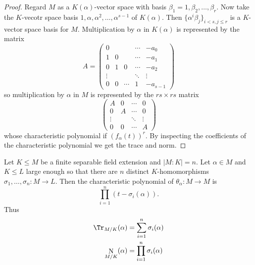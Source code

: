 \documentclass[a4paper]{article}
\DeclareMathOperator{\n}{N}
\begin{document}
\begin{proof}
  Regard \(M\) as a \(K(\alpha)\)-vector space with basis \(\beta_1 = 1, \beta_2, \dots, \beta_r\). Now take the \(K\)-vecotr space basis \(1, \alpha, \alpha^2, \dots, \alpha^{s - 1}\) of \(K(\alpha)\). Then \(\{\alpha^i \beta_j\}_{i < s, j \leq r}\) is a \(K\)-vector space basis for \(M\). Multiplication by \(\alpha\) in \(K(\alpha)\) is represented by the matrix
    \[
      A =
      \begin{pmatrix}
        0 & & & \cdots & -a_0 \\
        1 & 0 & & \cdots & -a_1 \\
        0 & 1 & 0 & \cdots & -a_2 \\
        \vdots & & & \ddots & \vdots \\
        0 & 0 & \cdots & 1 & -a_{s - 1}
      \end{pmatrix}
    \]
    so multiplication by \(\alpha\) in \(M\) is represented by the \(rs \times rs\) matrix
    \[
      \begin{pmatrix}
        A & 0 & \cdots & 0 \\
        0 & A & \cdots & 0 \\
        \vdots & & \ddots & \vdots \\
        0 & 0 & \cdots & A
      \end{pmatrix}
    \]
    whose characteristic polynomial if \((f_\alpha(t))^r\). By inspecting the coefficients of the characteristic polynomial we get the trace and norm.
\end{proof}

\begin{theorem}
  \label{thm:trace and norm of separable extension}
  Let \(K \leq M\) be a finite separable field extension and \(|M:K| = n\). Let \(\alpha \in M\) and \(K \leq L\) large enough so that there are \(n\) distinct \(K\)-homomorphisms \(\sigma_1, \dots, \sigma_n: M \to L\). Then the characteristic polynomial of \(\theta_\alpha: M \to M\) is
  \[
    \prod_{i = 1}^{n}(t - \sigma_i(\alpha)).
  \]
  Thus
  \begin{align*}
    \Tr_{M/K}(\alpha) &= \sum_{i = 1}^{n} \sigma_i(\alpha) \\
    \n_{M/K}(\alpha) &= \prod_{i = 1}^{n} \sigma_i(\alpha)
  \end{align*}
\end{theorem}
\end{document}
